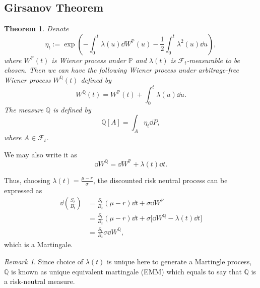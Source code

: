 \documentclass[10pt]{article}
\theoremstyle{remark}
\newtheorem{Remark}{Remark}[section]
\theoremstyle{plain}
\newtheorem{Theorem}{Theorem}[section]
\numberwithin{equation}{section}
\begin{document}
\subsection{Girsanov Theorem}
\begin{Theorem}
	Denote
	\[
		\eta_t := \exp(-\int_0^t \lambda(u) \dd{W^\mathbb{P}(u)} - \frac{1}{2} \int_0^t \lambda^2(u) \dd{u}), 
	\]
	where $W^\mathbb{P}(t)$ is Wiener process under $\mathbb{P}$ and $\lambda(t) $ is $\mathcal{F}_t$-measurable to be chosen. Then we can have the following Wiener process under arbitrage-free Wiener process $W^\mathbb{Q}(t)$ defined by
	\[
		W^\mathbb{Q}(t) = W^\mathbb{P}(t) + \int_0^t \lambda(u) \dd{u}. 
	\]
	The measure $\mathbb{Q}$ is defined by 
	\[
	\mathbb{Q}[A] = \int_A \eta_t \dd{P},
	\]
	where $A \in \mathcal{F}_t$.
\end{Theorem}

We may also write it as 
	\begin{equation}
		\dd{W^\mathbb{Q}} = \dd{W^\mathbb{P}} + \lambda(t) \dd{t}.
	\end{equation}

Thus, choosing $\lambda(t) = \frac{\mu - r}{\sigma}$, the discounted risk neutral process can be expressed as
	\begin{align*}
		\dd{\left(\frac{S_t}{B_t}\right)} & = \frac{S_t}{B_t} (\mu - r) \dd{t} + \sigma \dd{W^\mathbb{P}}
		\\
		& = \frac{S_t}{B_t} (\mu - r) \dd{t} + \sigma \big[\dd{W^\mathbb{Q}} - \lambda(t) \dd{t} \big]
		\\
		& = \frac{S_t}{B_t} \sigma \dd{W^\mathbb{Q}},
	\end{align*}
which is a Martingale.

\begin{Remark}
	Since choice of $\lambda(t)$ is unique here to generate a Martingle process, $\mathbb{Q}$ is known as unique equivalent martingale (EMM) which equals to say that $\mathbb{Q}$ is a risk-neutral measure.
\end{Remark}
\end{document}
